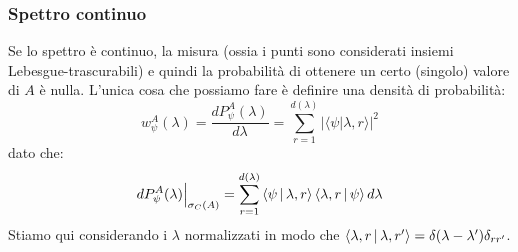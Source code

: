 \documentclass[../../FisicaTeorica.tex]{subfiles}
\begin{document}
\subsubsection{Spettro continuo}
Se lo spettro è continuo, la misura  (ossia i punti sono considerati insiemi Lebesgue-trascurabili) e quindi la probabilità di ottenere un certo (singolo) valore di $A$ è nulla. L'unica cosa che possiamo fare è definire una densità di probabilità:
\begin{equation}
w_\psi^A(\lambda)=\frac{dP_\psi^A(\lambda)}{d\lambda} = \sum_{r=1}^{d(\lambda)}|\langle\psi|\lambda,r\rangle|^2
\label{eqn:probability_continua}
\end{equation}
dato che:
\[
dP_\psi^A(\lambda)\Big|_{\sigma_C(A)}=\sum_{r=1}^{d(\lambda)}\Braket{\psi|\lambda,r}\Braket{\lambda,r|\psi}d\lambda
\]
Stiamo qui considerando i $\lambda$ normalizzati in modo che $\Braket{\lambda,r|\lambda,r'}=\delta(\lambda-\lambda')\delta_{rr'}$.
\end{document}
